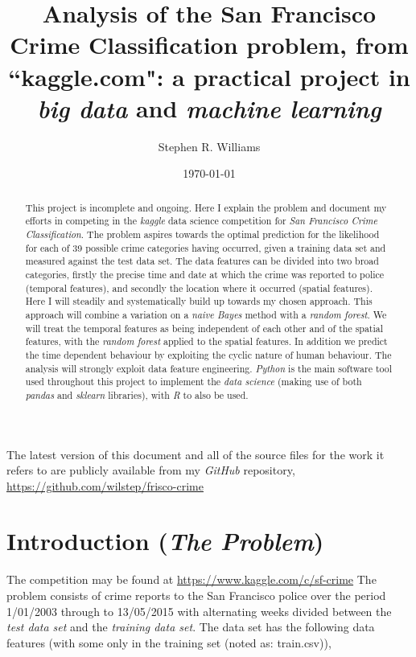 \documentclass[12pt,notitlepage]{article}
\title{Analysis of the San Francisco Crime Classification problem, from ``kaggle.com": a practical project in \emph{big data} and \emph{machine learning}}
\author{Stephen R. Williams}
\date{\today}  %
\begin{document}
\maketitle

\begin{abstract}
This project is incomplete and ongoing. Here I explain the problem and document my efforts in competing in the \emph{kaggle} data science competition for \emph{San Francisco Crime Classification}. The problem aspires towards the optimal prediction for the likelihood for each of 39 possible crime categories having occurred, given a training data set and measured against the test data set. The data features can be divided into two broad categories, firstly the precise time and date at which the crime was reported to police (temporal features), and secondly the location where it occurred (spatial features). Here I will steadily and systematically build up towards my chosen approach. This approach will combine a variation on a \emph{naive Bayes} method with a \emph{random forest}. We will treat the temporal features as being independent of each other and of the spatial features, with the \emph{random forest} applied to the spatial features. In addition we predict the time dependent behaviour by exploiting the cyclic nature of human behaviour. The analysis will strongly exploit data feature engineering. \emph{Python} is the main software tool used throughout this project to implement the \emph{data science} (making use of both \emph{pandas} and \emph{sklearn} libraries), with \emph{R} to also be used.
\end{abstract}

The latest version of this document and all of the source files for the work it refers to are publicly available from my \emph{GitHub} repository, \url{https://github.com/wilstep/frisco-crime}

\section{Introduction (\emph{The Problem})}

The competition may be found at \url{https://www.kaggle.com/c/sf-crime} The problem consists of crime reports to the San Francisco police over the period 1/01/2003 through to 13/05/2015 with alternating weeks divided between the \emph{test data set} and the \emph{training data set}. The data set has the following data features (with some only in the training set (noted as: train.csv)),
\end{document}
